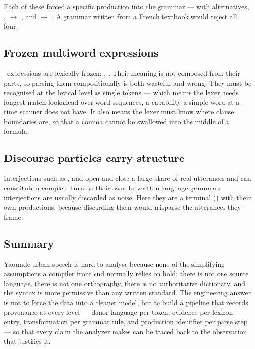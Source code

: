 Each of these forced a specific production into the grammar ---  with 
alternatives, ,  $\rightarrow$ , and
 $\rightarrow$  . A grammar written from
a French textbook would reject all four.

\subsection{Frozen multiword expressions}

\LexiconMultiword\ expressions are lexically frozen: , . Their meaning is not composed from their parts, so parsing them
compositionally is both wasteful and wrong. They must be recognised at the lexical level as
single  tokens --- which means the lexer needs longest-match lookahead over
word sequences, a capability a simple word-at-a-time scanner does not have. It also means
the lexer must know where clause boundaries are, so that a comma cannot be swallowed into
the middle of a formula.

\subsection{Discourse particles carry structure}

Interjections such as ,  and  open and close a large share of real
utterances and can constitute a complete turn on their own. In written-language grammars
interjections are usually discarded as noise. Here they are a terminal () with
their own productions, because discarding them would misparse the utterances they frame.

\subsection{Summary}

\begin{keypoint}
Yaound\'e urban speech is hard to analyse because none of the simplifying assumptions a
compiler front end normally relies on hold: there is not one source language, there is not
one orthography, there is no authoritative dictionary, and the syntax is more permissive
than any written standard. The engineering answer is not to force the data into a cleaner
model, but to build a pipeline that records provenance at every level --- donor language per
token, evidence per lexicon entry, transformation per grammar rule, and production
identifier per parse step --- so that every claim the analyzer makes can be traced back to
the observation that justifies it.
\end{keypoint}
